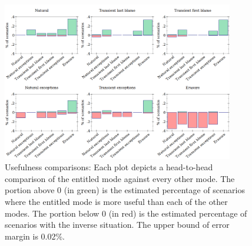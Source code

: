 \begin{figure}
  \centering
  \includegraphics[width=0.9\textwidth]{./plots/avo-bars}
  \caption{Usefulness comparisons: Each plot depicts a head-to-head comparison of the entitled mode against every other mode.
  The portion above 0 (in green) is the estimated percentage of scenarios where the entitled mode is more useful than each of the other modes.
  The portion below 0 (in red) is the estimated percentage of scenarios with the inverse situation.
  The upper bound of error margin is 0.02\%.}
  \label{fig:avo-bars}
\end{figure}

